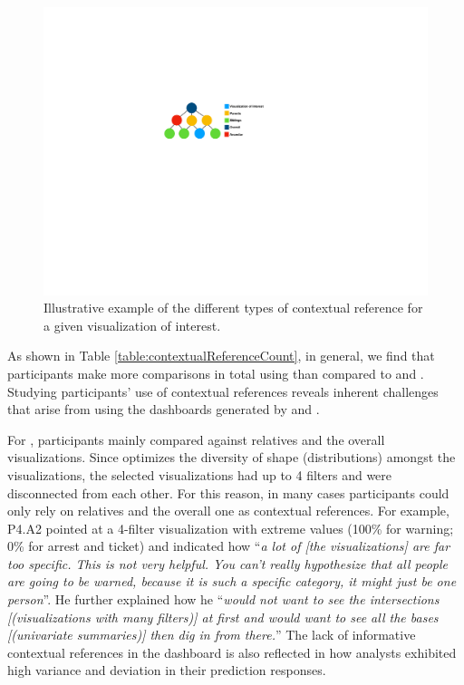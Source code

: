\begin{figure}[h!]
\centering
\includegraphics[width=\linewidth]{figures/contextual_reference.pdf}
\caption{Illustrative example of the different types of contextual reference for a given visualization of interest.}
\label{fig:reference}
\end{figure}
As shown in Table \ref{table:contextualReferenceCount}, in general, we find that participants make more comparisons in total using \system than compared to \cluster and \BFS. Studying participants' use of contextual references reveals inherent challenges that arise from using the dashboards generated by \BFS and \cluster. 
\par For \cluster, participants mainly compared against relatives and the overall visualizations. Since \cluster optimizes the diversity of shape (distributions) amongst the visualizations, the selected visualizations had up to 4 filters and were disconnected from each other. For this reason, in many cases participants could only rely on relatives and the overall one as contextual references. For example, P4.A2 pointed at a 4-filter visualization with extreme values (100\% for warning; 0\% for arrest and ticket) and indicated how ``\textit{a lot of [the visualizations] are far too specific. This is not very helpful. You can't really hypothesize that all people are going to be warned, because it is such a specific category, it might just be one person}''. %
He further explained how he ``\textit{would not want to see the intersections [(visualizations with many filters)] at first and would want to see all the bases [(univariate summaries)] then dig in from there.}'' The lack of informative contextual references in the \cluster dashboard is also reflected in how analysts exhibited high variance and deviation in their prediction responses.
